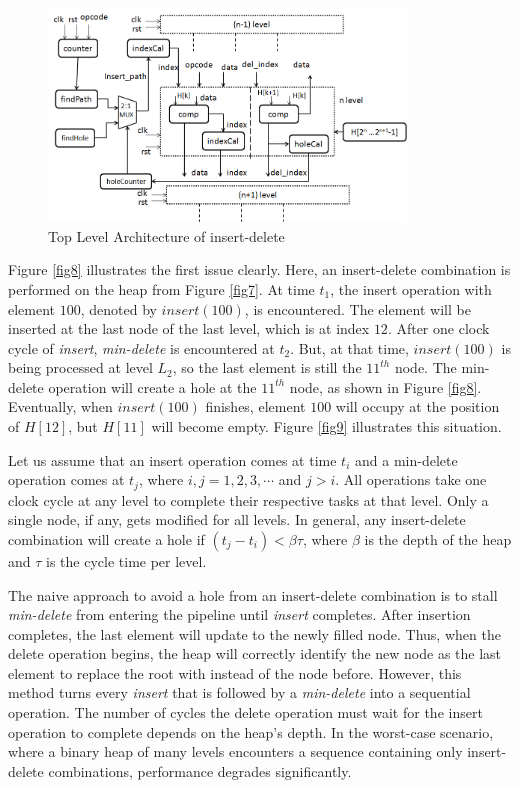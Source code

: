 \begin{figure}[!ht]
  \centering
  \includegraphics[width=9.5cm]{fig/2.png}
      \caption{Top Level Architecture of insert-delete}
    \label{fig10}
\end{figure}

Figure \ref{fig8} illustrates the first issue clearly.
Here, an insert-delete combination is performed on the heap from Figure \ref{fig7}.
At time $t_1$, the insert operation with element $100$, denoted by $insert(100)$, is encountered.
The element will be inserted at the last node of the last level, which is at index $12$.
After one clock cycle of {\it insert}, {\it min-delete} is encountered at $t_2$.
But, at that time, $insert(100)$ is being processed at level $L_2$, so the last element is still the $11^{th}$ node.
The min-delete operation will create a hole at the $11^{th}$ node, as shown in Figure \ref{fig8}.
Eventually, when $insert(100)$ finishes, element $100$ will occupy at the position of $H[12]$, but $H[11]$ will become empty.
Figure \ref{fig9} illustrates this situation.

Let us assume that an insert operation comes at time $t_i$ and a min-delete operation comes at $t_j$, where $i, j = 1,2,3, \cdots$ and $j>i$.
All operations take one clock cycle at any level to complete their respective tasks at that level.
Only a single node, if any, gets modified for all levels.
In general, any insert-delete combination will create a hole if $(t_j - t_i) < \beta\tau$, where $\beta$ is the depth of the heap and $\tau$ is the cycle time per level.

The naive approach to avoid a hole from an insert-delete combination is to stall {\it min-delete} from entering the pipeline until {\it insert} completes.
After insertion completes, the last element will update to the newly filled node.
Thus, when the delete operation begins, the heap will correctly identify the new node as the last element to replace the root with instead of the node before.
However, this method turns every {\it insert} that is followed by a {\it min-delete} into a sequential operation.
The number of cycles the delete operation must wait for the insert operation to complete depends on the heap's depth.
In the worst-case scenario, where a binary heap of many levels encounters a sequence containing only insert-delete combinations, performance degrades significantly.

